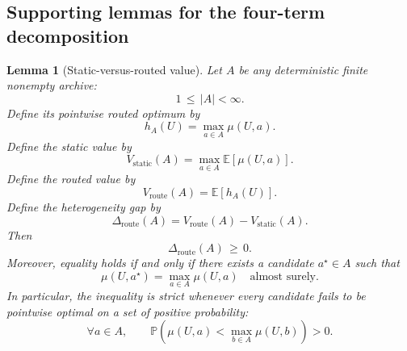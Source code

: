 \documentclass{article} %
\newtheorem{lemma}[theorem]{Lemma}
\begin{document}
\subsection{Supporting lemmas for the four-term decomposition}

\begin{lemma}[Static-versus-routed value]
\label{lem:1}
Let \(A\) be any deterministic finite nonempty archive:
\begin{equation}
\label{eq:app-lem1-archive}
1 \,\le\, |A| < \infty.
\end{equation}
Define its pointwise routed optimum by
\begin{equation}
\label{eq:app-lem1-h}
h_A(U)
=
\max_{a\in A}\mu(U,a).
\end{equation}
Define the static value by
\begin{equation}
\label{eq:app-lem1-static}
V_{\mathrm{static}}(A)
=
\max_{a\in A}\mathbb{E}[\mu(U,a)].
\end{equation}
Define the routed value by
\begin{equation}
\label{eq:app-lem1-route}
V_{\mathrm{route}}(A)
=
\mathbb{E}[h_A(U)].
\end{equation}
Define the heterogeneity gap by
\begin{equation}
\label{eq:app-lem1-gap}
\Delta_{\mathrm{route}}(A)
=
V_{\mathrm{route}}(A)-V_{\mathrm{static}}(A).
\end{equation}
Then
\begin{equation}
\label{eq:app-lem1-nonnegative}
\Delta_{\mathrm{route}}(A)\,\ge\, 0.
\end{equation}
Moreover, equality holds if and only if there exists a candidate \(a^\star\in A\) such that
\begin{equation}
\label{eq:app-lem1-equality-condition}
\mu(U,a^\star)
=
\max_{a\in A}\mu(U,a)
\quad
\text{almost surely}.
\end{equation}
In particular, the inequality is strict whenever every candidate fails to be pointwise optimal on a set of positive probability:
\begin{equation}
\label{eq:app-lem1-strict-condition}
\forall a\in A,
\qquad
\mathbb{P}\!\left(
\mu(U,a)
<
\max_{b\in A}\mu(U,b)
\right)
>
0.
\end{equation}
\end{lemma}
\end{document}
